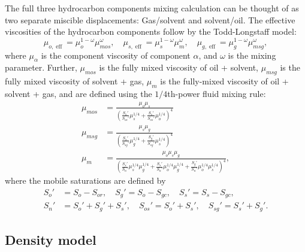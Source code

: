 \documentclass[11pt, a4paper]{article}
\DeclareMathOperator{\eff}{eff}
\begin{document}
The full three hydrocarbon components mixing calculation can be thought of as two separate miscible
displacements: Gas/solvent and solvent/oil. The effective viscosities of the hydrocarbon components
follow by the Todd-Longstaff model:
\begin{equation*}
  \mu_{o, \eff} = \mu_o^{1-\omega}\mu_{mos}^\omega, \quad
  \mu_{s, \eff} = \mu_s^{1-\omega}\mu_{m}^\omega, \quad
  \mu_{g, \eff} = \mu_g^{1-\omega}\mu_{msg}^\omega,
\end{equation*}
where $\mu_\alpha$ is the component viscosity of component $\alpha$, and $\omega$ is the mixing
parameter. Further, $\mu_{mos}$ is the fully mixed viscosity of oil + solvent, $\mu_{msg}$ is the
fully mixed viscosity of solvent + gas, $\mu_m$ is the fully-mixed viscosity of oil + solvent + gas,
and are defined using the $1/4$th-power fluid mixing rule:
\begin{align*}
  \mu_{mos} & = \frac{\mu_o \mu_s}{\left(\frac{S_o'}{S_{os}'}\mu_s^{1/4} + \frac{S_s'}{S_{os}'}\mu_o^{1/4}\right)^4} \\
  \mu_{msg} & = \frac{\mu_s \mu_g}{\left(\frac{S_s'}{S_{sg}'}\mu_g^{1/4} + \frac{S_g'}{S_{sg}'}\mu_s^{1/4}\right)^4} \\
  \mu_{m} & = \frac{\mu_o \mu_s \mu_g}{\left(\frac{S_s'}{S_{n}'}\mu_s^{1/4}\mu_g^{1/4}
            + \frac{S_s'}{S_{n}'}\mu_o^{1/4}\mu_g^{1/4}
            + \frac{S_g'}{S_{n}'}\mu_o^{1/4}\mu_s^{1/4}\right)^4},
\end{align*}
where the mobile saturations are defined by
\begin{align*}
  S_o' & = S_o - S_{or}, \quad S_g' = S_o - S_{gc}, \quad S_s' = S_s - S_{gc}, \\
  S_n' & = S_o' + S_g' + S_s', \quad S_{os}' = S_o' + S_s', \quad S_{sg}' = S_s' + S_g'.
\end{align*}

\subsection*{Density model}
\end{document}
